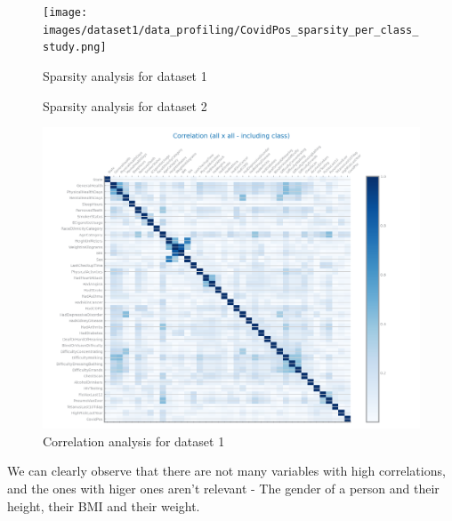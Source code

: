 \documentclass[10pt]{extarticle}
\begin{document}
\begin{figure}[H]
\centering\texttt{[image: images/dataset1/data\_profiling/CovidPos\_sparsity\_per\_class\_study.png]}
\caption{Sparsity analysis for dataset 1}
\end{figure}

\begin{figure}[H]
\caption{Sparsity analysis for dataset 2}
\end{figure}

\begin{figure}[H]
\centering\includegraphics[scale=0.6]{images/dataset1/data_profiling/CovidPos_correlation_analysis.png}
\caption{Correlation analysis for dataset 1}
\end{figure}
We can clearly observe that there are not many variables with high correlations, and the ones with higer ones aren't relevant -
The gender of a person and their height, their BMI and their weight.
\end{document}
